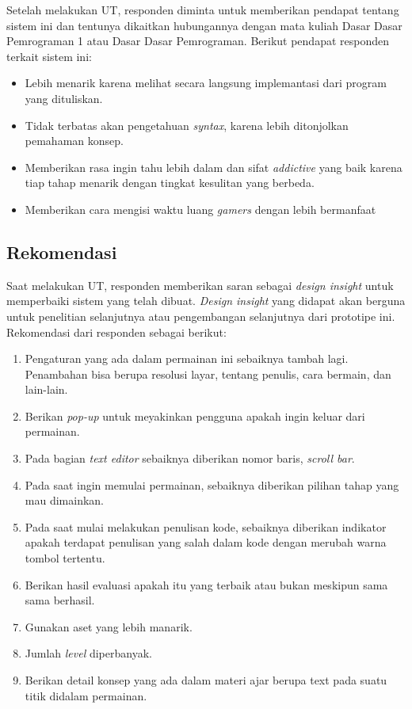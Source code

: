 	Setelah melakukan UT, responden diminta untuk memberikan pendapat tentang sistem ini dan tentunya dikaitkan hubungannya dengan mata kuliah Dasar Dasar Pemrograman 1 atau Dasar Dasar Pemrograman. Berikut pendapat responden terkait sistem ini:
	\begin{itemize}
		\item Lebih menarik karena melihat secara langsung implemantasi dari program yang dituliskan.
		\item Tidak terbatas akan pengetahuan \textit{syntax}, karena lebih ditonjolkan pemahaman konsep.
		\item Memberikan rasa ingin tahu lebih dalam dan sifat \textit{addictive} yang baik karena tiap tahap menarik dengan tingkat kesulitan yang berbeda.
		\item Memberikan cara mengisi waktu luang \textit{gamers} dengan lebih bermanfaat
	\end{itemize}
	\subsection{Rekomendasi}
	Saat melakukan UT, responden memberikan saran sebagai \textit{design insight} untuk memperbaiki sistem yang telah dibuat. \textit{Design insight} yang didapat akan berguna untuk penelitian selanjutnya atau pengembangan selanjutnya dari prototipe ini. Rekomendasi dari responden sebagai berikut:
	\begin{enumerate}
		\item Pengaturan yang ada dalam permainan ini sebaiknya tambah lagi. Penambahan bisa berupa resolusi layar, tentang penulis, cara bermain, dan lain-lain.
		\item Berikan \textit{pop-up} untuk meyakinkan pengguna apakah ingin keluar dari permainan.
		\item Pada bagian \textit{text editor} sebaiknya diberikan nomor baris, \textit{scroll bar}.
		\item Pada saat ingin memulai permainan, sebaiknya diberikan pilihan tahap yang mau dimainkan.
		\item Pada saat mulai melakukan penulisan kode, sebaiknya diberikan indikator apakah terdapat penulisan yang salah dalam kode dengan merubah warna tombol tertentu.
		\item Berikan hasil evaluasi apakah itu yang terbaik atau bukan meskipun sama sama berhasil.
		\item Gunakan aset yang lebih manarik.
		\item Jumlah \textit{level} diperbanyak.
		\item Berikan detail konsep yang ada dalam materi ajar berupa text pada suatu titik didalam permainan.	
	\end{enumerate}
	